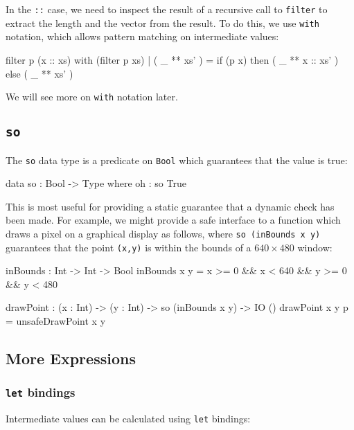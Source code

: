 \noindent
In the \texttt{::} case, we need to inspect the result of a recursive call to \texttt{filter} to extract the length and the vector from the result.
To do this, we use \texttt{with} notation, which allows pattern matching on intermediate values:

\begin{code}
filter p (x :: xs) with (filter p xs)
  | ( _ ** xs' ) = if (p x) then ( _ ** x :: xs' ) else ( _ ** xs' )
\end{code}

\noindent
We will see more on \texttt{with} notation later.

\subsection{\texttt{so}}

The \texttt{so} data type is a predicate on \texttt{Bool} which guarantees that the value is true:

\begin{code}
data so : Bool -> Type where
    oh : so True
\end{code}

\noindent
This is most useful for providing a static guarantee that a dynamic check has been made.
For example, we might provide a safe interface to a function which draws a pixel on a graphical display as follows, where \texttt{so (inBounds x y)} guarantees that  the point \texttt{(x,y)} is within the bounds of a $640\times480$ window:

\begin{code}
inBounds : Int -> Int -> Bool
inBounds x y = x >= 0 && x < 640 && y >= 0 && y < 480

drawPoint : (x : Int) -> (y : Int) -> so (inBounds x y) -> IO ()
drawPoint x y p = unsafeDrawPoint x y
\end{code}


\subsection{More Expressions}

\subsubsection*{\texttt{let} bindings}

Intermediate values can be calculated using \texttt{let} bindings:


